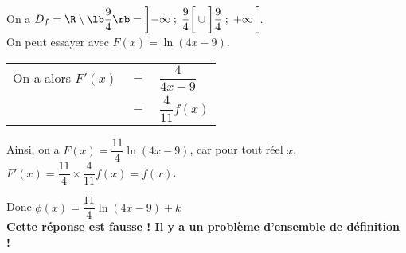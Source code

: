 \vspace*{.3cm}

On a $D_f = \R \setminus \lb \dfrac{9}{4} \rb = \left]-\infty \; ; \; \dfrac{9}{4}\right[ \cup \left]\dfrac{9}{4} \; ; \; +\infty\right[$. \\

On peut essayer avec $F(x) = \ln\left(4x-9\right)$. \\

\begin{tabular}{lll}
\hspace*{-.3cm} On a alors $F'(x)$ & $=$ & $ \dfrac{4}{4x-9}$ \vspace*{.3cm} \\
& $=$ & $ \dfrac{4}{11}f\left(x\right)$ \\
\end{tabular}

\vspace*{.3cm}

Ainsi, on a $F(x) = \dfrac{11}{4}\ln\left(4x-9\right)$, car pour tout réel $x$, $F'\left(x\right) = \dfrac{11}{4}  \times \dfrac{4}{11} f\left(x\right) = f\left(x\right)$. 

\vspace*{.3cm}

Donc $\phi\left(x\right) = \dfrac{11}{4}\ln\left(4x-9\right) + k$ \\

\textbf{Cette réponse est fausse ! Il y a un problème d'ensemble de définition !} \\

